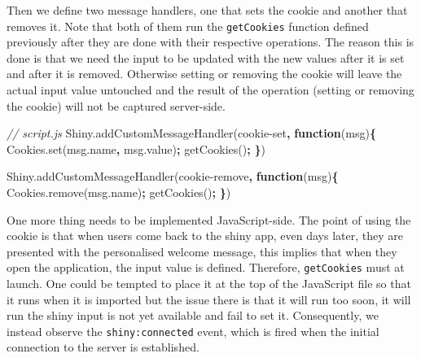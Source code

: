 \documentclass[
]{krantz}
\makeatletter
\newenvironment{Shaded}{\begin{snugshade}}{\end{snugshade}}
\newcommand{\AttributeTok}[1]{\textcolor[rgb]{0.61,0.61,0.61}{#1}}
\newcommand{\CommentTok}[1]{\textcolor[rgb]{0.37,0.37,0.37}{\textit{#1}}}
\newcommand{\KeywordTok}[1]{\textcolor[rgb]{0.27,0.27,0.27}{\textbf{#1}}}
\newcommand{\NormalTok}[1]{#1}
\newcommand{\OperatorTok}[1]{\textcolor[rgb]{0.43,0.43,0.43}{\textbf{#1}}}
\newcommand{\StringTok}[1]{\textcolor[rgb]{0.5,0.5,0.5}{#1}}
\newcommand{\VariableTok}[1]{\textcolor[rgb]{0,0,0}{#1}}
\newenvironment{kframe}{%
\medskip{}
\setlength{\fboxsep}{.8em}
 \def\at@end@of@kframe{}%
 \ifinner\ifhmode%
  \def\at@end@of@kframe{\end{minipage}}%
  \begin{minipage}{\columnwidth}%
 \fi\fi%
 \def\FrameCommand##1{\hskip\@totalleftmargin \hskip-\fboxsep
 \colorbox{shadecolor}{##1}\hskip-\fboxsep
     \hskip-\linewidth \hskip-\@totalleftmargin \hskip\columnwidth}%
 \MakeFramed {\advance\hsize-\width
   \@totalleftmargin\z@ \linewidth\hsize
   \@setminipage}}%
 {\par\unskip\endMakeFramed%
 \at@end@of@kframe}
\renewenvironment{Shaded}{\begin{kframe}}{\end{kframe}}
\makeatother
\begin{document}
Then we define two message handlers, one that sets the cookie and another that removes it. Note that both of them run the \texttt{getCookies} function defined previously after they are done with their respective operations. The reason this is done is that we need the input to be updated with the new values after it is set and after it is removed. Otherwise setting or removing the cookie will leave the actual input value untouched and the result of the operation (setting or removing the cookie) will not be captured server-side.

\begin{Shaded}
\begin{Highlighting}[]
\CommentTok{// script.js}
\VariableTok{Shiny}\NormalTok{.}\AttributeTok{addCustomMessageHandler}\NormalTok{(}\StringTok{\textquotesingle{}cookie{-}set\textquotesingle{}}\OperatorTok{,} \KeywordTok{function}\NormalTok{(msg)}\OperatorTok{\{}
  \VariableTok{Cookies}\NormalTok{.}\AttributeTok{set}\NormalTok{(}\VariableTok{msg}\NormalTok{.}\AttributeTok{name}\OperatorTok{,} \VariableTok{msg}\NormalTok{.}\AttributeTok{value}\NormalTok{)}\OperatorTok{;}
  \AttributeTok{getCookies}\NormalTok{()}\OperatorTok{;}
\OperatorTok{\}}\NormalTok{)}

\VariableTok{Shiny}\NormalTok{.}\AttributeTok{addCustomMessageHandler}\NormalTok{(}\StringTok{\textquotesingle{}cookie{-}remove\textquotesingle{}}\OperatorTok{,} \KeywordTok{function}\NormalTok{(msg)}\OperatorTok{\{}
  \VariableTok{Cookies}\NormalTok{.}\AttributeTok{remove}\NormalTok{(}\VariableTok{msg}\NormalTok{.}\AttributeTok{name}\NormalTok{)}\OperatorTok{;}
  \AttributeTok{getCookies}\NormalTok{()}\OperatorTok{;}
\OperatorTok{\}}\NormalTok{)}
\end{Highlighting}
\end{Shaded}

One more thing needs to be implemented JavaScript-side. The point of using the cookie is that when users come back to the shiny app, even days later, they are presented with the personalised welcome message, this implies that when they open the application, the input value is defined. Therefore, \texttt{getCookies} must at launch. One could be tempted to place it at the top of the JavaScript file so that it runs when it is imported but the issue there is that it will run too soon, it will run the shiny input is not yet available and fail to set it. Consequently, we instead observe the \texttt{shiny:connected} event, which is fired when the initial connection to the server is established.
\end{document}
